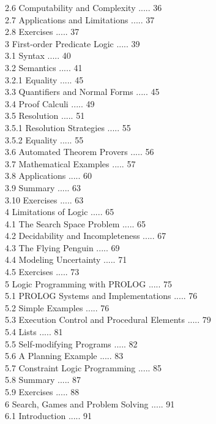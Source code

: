 \documentclass[10pt]{article}
\begin{document}
2.6 Computability and Complexity ..... 36\\
2.7 Applications and Limitations ..... 37\\
2.8 Exercises ..... 37\\
3 First-order Predicate Logic ..... 39\\
3.1 Syntax ..... 40\\
3.2 Semantics ..... 41\\
3.2.1 Equality ..... 45\\
3.3 Quantifiers and Normal Forms ..... 45\\
3.4 Proof Calculi ..... 49\\
3.5 Resolution ..... 51\\
3.5.1 Resolution Strategies ..... 55\\
3.5.2 Equality ..... 55\\
3.6 Automated Theorem Provers ..... 56\\
3.7 Mathematical Examples ..... 57\\
3.8 Applications ..... 60\\
3.9 Summary ..... 63\\
3.10 Exercises ..... 63\\
4 Limitations of Logic ..... 65\\
4.1 The Search Space Problem ..... 65\\
4.2 Decidability and Incompleteness ..... 67\\
4.3 The Flying Penguin ..... 69\\
4.4 Modeling Uncertainty ..... 71\\
4.5 Exercises ..... 73\\
5 Logic Programming with PROLOG ..... 75\\
5.1 PROLOG Systems and Implementations ..... 76\\
5.2 Simple Examples ..... 76\\
5.3 Execution Control and Procedural Elements ..... 79\\
5.4 Lists ..... 81\\
5.5 Self-modifying Programs ..... 82\\
5.6 A Planning Example ..... 83\\
5.7 Constraint Logic Programming ..... 85\\
5.8 Summary ..... 87\\
5.9 Exercises ..... 88\\
6 Search, Games and Problem Solving ..... 91\\
6.1 Introduction ..... 91\\
\end{document}
